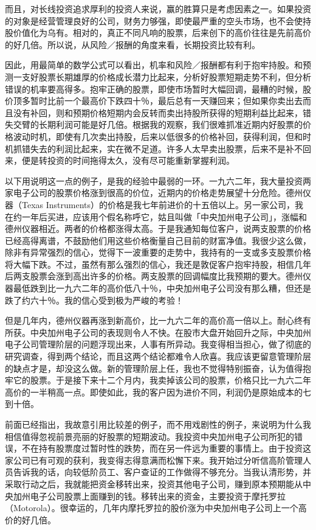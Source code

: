 \documentclass[UTF8,a4paper,zihao=-4,fontset = windows]{ctexart} %
\begin{document}
而且，对长线投资追求厚利的投资人来说，赢的胜算只是考虑因素之一。如果投资的对象是经营管理良好的公司，财务力够强，即使最严重的空头市场，也不会使持股价值化为乌有。相对的，真正不同凡响的股票，后来创下的高价往往是先前高价的好几倍。所以说，从风险／报酬的角度来看，长期投资比较有利。

因此，用最简单的数学公式可以看出，机率和风险／报酬都有利于抱牢持股。和预测一支好股票长期雄厚的价格成长潜力比起来，分析好股票短期走势不利，但分析错误的机率要高得多。抱牢正确的股票，即使市场暂时大幅回调，最糟的时候，股价顶多暂时比前一个最高价下跌四十％，最后总有一天赚回来；但如果你卖出去而且没有补回，则和预期价格短期内会反转而卖出持股所获得的短期利益比起来，错失交臂的长期利润可能是好几倍。根据我的观察，我们很难抓准近期内好股票的价格波动时机，即使有几次卖出持股，后来以低很多的价格补回，获得利润，但和时机抓错失去的利润比起来，实在微不足道。许多人太早卖出股票，后来不是补不回来，便是转投资的时间拖得太久，没有尽可能重新掌握利润。

以下用说明这一点的例子，是我的经验中最弱的一环。一九六二年，我大量投资两家电子公司的股票价格涨到很高的价位，近期内的价格走势展望十分危险。德州仪器（Texas Instruments）的价格是我七年前进价的十五倍以上。另一家公司，我在约一年后买进，应该用个假名称呼它，姑且叫做「中央加州电子公司」，涨幅和德州仪器相近。两者的价格都涨得太高。于是我通知每位客户，说两支股票的价格已经高得离谱，不鼓励他们用这些价格衡量自己目前的财富净值。我很少这么做，除非有异常强烈的信心，觉得下一波重要的走势中，我持有的一支或多支股票价格将大幅下跌。不过，虽然有那么强烈的信心，我还是敦促客户抱牢持股，相信几年后两支股票会涨到高出许多的价格。两支股票的回调幅度比我预期的要大。德州仪器最低跌到比一九六二年的高价低八十％，中央加州电子公司没有那么糟，但还是跌了约六十％。我的信心受到极为严峻的考验！

但是几年内，德州仪器再涨到新高价，比一九六二年的高价高一倍以上。耐心终有所获。中央加州电子公司的表现则令人不快。在股市大盘开始回升之际，中央加州电子公司管理阶层的问题浮现出来，人事有所异动。我变得相当担心，做了彻底的研究调查，得到两个结论，而且这两个结论都难令人欣喜。我应该更留意管理阶层的缺点才是，却没这么做。新的管理阶层上任，我也不觉得特别振奋，认为值得抱牢它的股票。于是接下来十二个月内，我卖掉该公司的股票，价格只比一九六二年高价的一半稍高一点。即使如此，我的客户因为进价不同，利润仍是原始成本的七到十倍。

前面已经指出，我故意引用比较差的例子，而不用戏剧性的例子，来说明为什么我相信值得忽视前景亮丽的好股票的短期波动。我投资中央加州电子公司所犯的错误，不在持有股票度过暂时性的跌势，而在另一件远为重要的事情上。由于投资这家公司已有可观的获利，我变得志得意满而松懈下来。我开始过分听信高阶管理人员告诉我的话，向较低阶员工、客户查证的工作做得不够充分。当我认清形势，并采取行动之后，我就能把资金移转出来，投资其他电子公司，赚到原本预期能从中央加州电子公司股票上面赚到的钱。移转出来的资金，主要投资于摩托罗拉（Motorola）。很幸运的，几年内摩托罗拉的股价涨为中央加州电子公司上一个高价的好几倍。
\\
\end{document}
